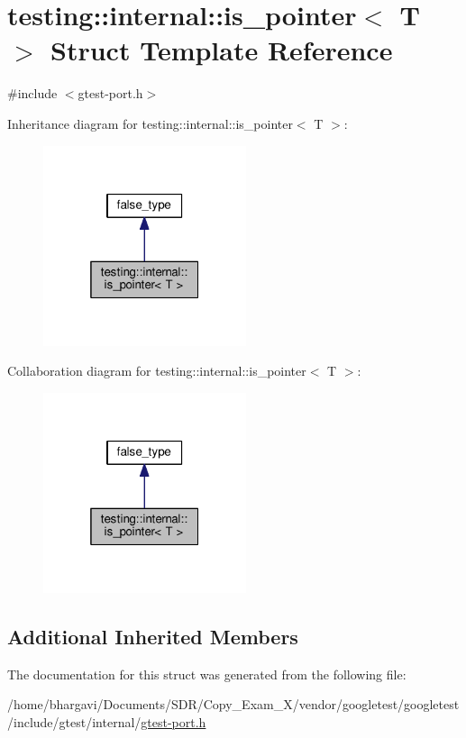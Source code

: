 \hypertarget{structtesting_1_1internal_1_1is__pointer}{}\section{testing\+:\+:internal\+:\+:is\+\_\+pointer$<$ T $>$ Struct Template Reference}
\label{structtesting_1_1internal_1_1is__pointer}


{\ttfamily \#include $<$gtest-\/port.\+h$>$}



Inheritance diagram for testing\+:\+:internal\+:\+:is\+\_\+pointer$<$ T $>$\+:
\nopagebreak
\begin{figure}[H]
\begin{center}
\leavevmode
\includegraphics[width=169pt]{structtesting_1_1internal_1_1is__pointer__inherit__graph}
\end{center}
\end{figure}


Collaboration diagram for testing\+:\+:internal\+:\+:is\+\_\+pointer$<$ T $>$\+:
\nopagebreak
\begin{figure}[H]
\begin{center}
\leavevmode
\includegraphics[width=169pt]{structtesting_1_1internal_1_1is__pointer__coll__graph}
\end{center}
\end{figure}
\subsection*{Additional Inherited Members}


The documentation for this struct was generated from the following file\+:\begin{DoxyCompactItemize}
\item 
/home/bhargavi/\+Documents/\+S\+D\+R/\+Copy\+\_\+\+Exam\+\_\+X/vendor/googletest/googletest/include/gtest/internal/\hyperlink{gtest-port_8h}{gtest-\/port.\+h}\end{DoxyCompactItemize}
